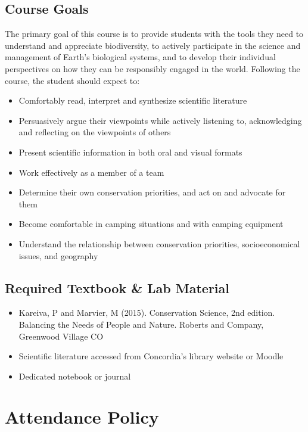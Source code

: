 \documentclass{tufte-handout}
\begin{document}
\begin{fullwidth}

\subsection{Course Goals}

The primary goal of this course is to provide students with the tools they need to understand and appreciate biodiversity, to actively participate in the science and management of Earth’s biological systems, and to develop their individual perspectives on how they can be responsibly engaged in the world. Following the course, the student should expect to:

\begin{itemize}
	\item Comfortably read, interpret and synthesize scientific literature
	\item Persuasively argue their viewpoints while actively listening to, acknowledging and reflecting on the viewpoints of others
	\item Present scientific information in both oral and visual formats
	\item Work effectively as a member of a team
	\item Determine their own conservation priorities, and act on and advocate for them
	\item Become comfortable in camping situations and with camping equipment
	\item Understand the relationship between conservation priorities, socioeconomical issues, and geography
\end{itemize}

\subsection{Required Textbook \& Lab Material}

\begin{itemize}
	\item Kareiva, P and Marvier, M (2015). Conservation Science, 2nd edition. Balancing the Needs of People and Nature. Roberts and Company, Greenwood Village CO
	\item Scientific literature accessed from Concordia's library website or  Moodle
	\item Dedicated notebook or journal
\end{itemize}

\section{Attendance Policy}


\end{fullwidth}
\end{document}
